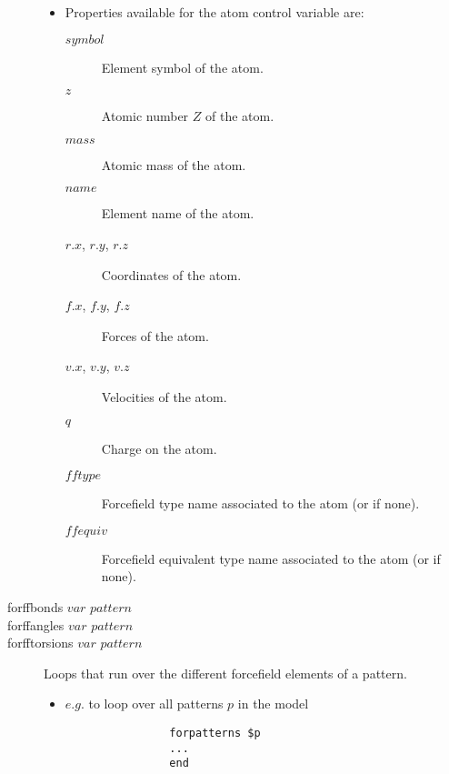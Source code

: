 \begin{description}
\begin{itemize}
			\item Properties available for the atom control variable are:
			\begin{description}
				\item[$symbol$\its]
					Element symbol of the atom.
				\item[$z$\its]
					Atomic number $Z$ of the atom.
				\item[$mass$\its]
					Atomic mass of the atom.
				\item[$name$\its]
					Element name of the atom.
				\item[$r.x$, $r.y$, $r.z$\its]
					Coordinates of the atom.
				\item[$f.x$, $f.y$, $f.z$\its]
					Forces of the atom.
				\item[$v.x$, $v.y$, $v.z$\its]
					Velocities of the atom.
				\item[$q$\its]
					Charge on the atom.
				\item[$fftype$\its]
					Forcefield type name associated to the atom (or  if none).
				\item[$ffequiv$\its]
					Forcefield equivalent type name associated to the atom (or  if none).
			\end{description}
		\end{itemize}

	\item[forffbonds $var$ $pattern$]
	\item[forffangles $var$ $pattern$]
	\item[forfftorsions $var$ $pattern$\its]
		Loops that run over the different forcefield elements of a pattern.
		\begin{itemize}
			\item $e.g.$ to loop over all patterns $p$ in the model
			\begin{verbatim}
				forpatterns $p
				...
				end
			\end{verbatim}


\end{itemize}
\end{description}
